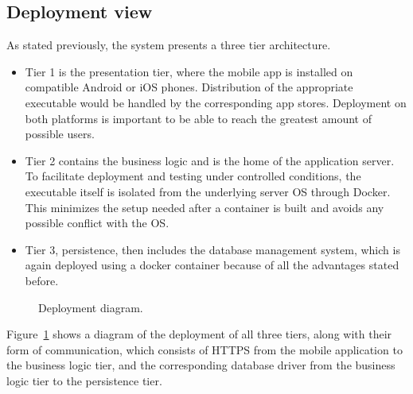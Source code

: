 \subsection{Deployment view}

As stated previously, the system presents a three tier architecture.
\begin{itemize}
    \item Tier 1 is the presentation tier, where the mobile app is installed on compatible Android or iOS phones. Distribution of the appropriate executable would be handled by the corresponding app stores. Deployment on both platforms is important to be able to reach the greatest amount of possible users.
    \item Tier 2 contains the business logic and is the home of the application server. To facilitate deployment and testing under controlled conditions, the executable itself is isolated from the underlying server OS through Docker. This minimizes the setup needed after a container is built and avoids any possible conflict with the OS.
    \item Tier 3, persistence, then includes the database management system, which is again deployed using a docker container because of all the advantages stated before. 
\end{itemize}

\begin{figure}[H]
    \centering
    \caption{\label{fig:deployment-diagram}Deployment diagram.}
\end{figure}

Figure~\ref{fig:deployment-diagram} shows a diagram of the deployment of all three tiers, along with their form of communication, which consists of HTTPS from the mobile application to the business logic tier, and the corresponding database driver from the business logic tier to the persistence tier. 

